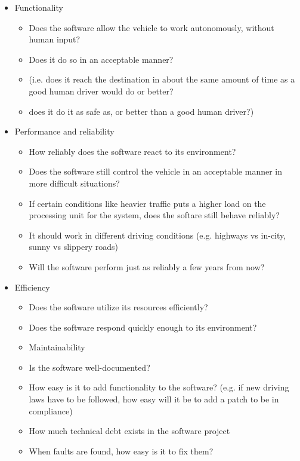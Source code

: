 \documentclass[letterpaper]{article}
\begin{document}
\begin{itemize}
	\item Functionality
		
	\begin{itemize}
		\item Does the software allow the vehicle to work autonomously, without human input? 
		\item Does it do so in an acceptable manner? 
		\item (i.e. does it reach the destination in about the same amount of time as a good human driver would do or better?
		\item does it do it as safe as, or better than a good human driver?)
	\end{itemize}
	\item Performance and reliability
	\begin{itemize}
		\item How reliably does the software react to its environment?
		\item Does the software still control the vehicle in an acceptable manner in more difficult situations?
		\item If certain conditions like heavier traffic puts a higher load on the processing unit for the system, does the softare still behave reliably?
		\item It should work in different driving conditions (e.g. highways vs in-city, sunny vs slippery roads)
		\item Will the software perform just as reliably a few years from now?
	\end{itemize}
		\item Efficiency
	\begin{itemize}
		\item Does the software utilize its resources efficiently?
		\item Does the software respond quickly enough to its environment?
	\item Maintainability
\end{itemize}
	\begin{itemize}	
	\item Is the software well-documented?
		\item How easy is it to add functionality to the software? (e.g. if new driving laws have to be followed, how easy will it be to add a patch to be in compliance)
		\item How much technical debt exists in the software project
		\item When faults are found, how easy is it to fix them?

\end{itemize}
\end{itemize}
\end{document}
